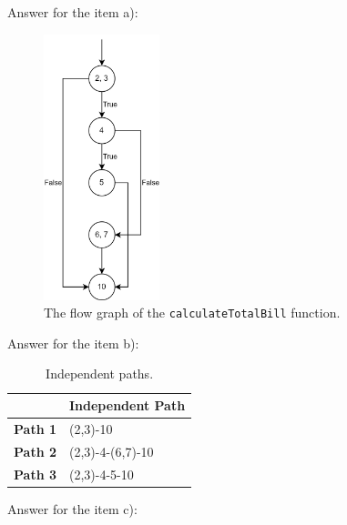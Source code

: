 \begin{solution}
    Answer for the item a):
    \begin{figure}[H]
        \centering
        \includegraphics[width=0.3\textwidth]{images/exercise-6a-solution.png}
        \caption{The flow graph of the \lstinline!calculateTotalBill! function.}
        \label{fig:ex6-fg}
    \end{figure}

    Answer for the item b):
    \begin{table}[H]
        \centering
        \renewcommand{\arraystretch}{1.2}
        \caption{Independent paths.}
        \label{tab:ex3-indep-paths}
        \begin{tabularx}{\textwidth}{lX}
            \toprule
             & Independent Path\\
            \midrule
            \textbf{Path 1} & (2,3)-10\\
            \textbf{Path 2} & (2,3)-4-(6,7)-10\\
            \textbf{Path 3} & (2,3)-4-5-10\\
            \bottomrule
        \end{tabularx}
    \end{table}
    
    Answer for the item c):
    

\end{solution}
